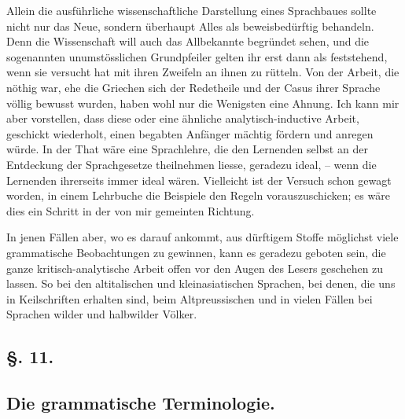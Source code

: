 Allein die ausführliche wissenschaftliche Darstellung eines Sprachbaues sollte nicht nur das Neue, sondern überhaupt Alles als beweisbedürftig behandeln. Denn die Wissenschaft will auch das Allbekannte begründet sehen, und die sogenannten unumstösslichen Grundpfeiler gelten ihr erst dann als feststehend, wenn sie versucht hat mit ihren Zweifeln an ihnen zu rütteln. Von der Arbeit, die nöthig war, ehe die Griechen sich der Redetheile und der Casus ihrer Sprache völlig bewusst wurden, haben wohl nur die Wenigsten eine Ahnung. Ich kann mir aber vorstellen, dass diese oder eine ähnliche analytisch-inductive Arbeit, geschickt \label{fp.120} wiederholt, einen begabten Anfänger mächtig fördern und anregen würde. In der That wäre eine Sprachlehre, die den Lernenden selbst an der Entdeckung der Sprachgesetze theilnehmen liesse, geradezu ideal, – wenn die Lernenden ihrerseits immer ideal wären. Vielleicht ist der Versuch schon gewagt worden, in einem Lehrbuche die Beispiele den Regeln vorauszuschicken; es wäre dies ein Schritt in der von mir gemeinten Richtung.

In jenen Fällen aber, wo es darauf ankommt, aus dürftigem Stoffe möglichst viele grammatische Beobachtungen zu gewinnen, kann es geradezu geboten sein, die ganze kritisch-analytische Arbeit offen vor den Augen des Lesers geschehen zu lassen. So bei den altitalischen und kleinasiatischen Sprachen, bei denen, die uns in Keilschriften erhalten sind, beim Altpreussischen und in vielen Fällen bei Sprachen wilder und halbwilder Völker.

\subsection*{§. 11.}\label{II.VI.11}
\subsection*{Die grammatische Terminologie.}

